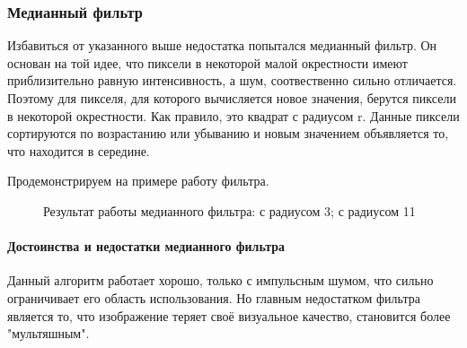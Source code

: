 \subsubsection{Медианный фильтр}
Избавиться от указанного выше недостатка попытался медианный фильтр. Он основан на той идее, что пиксели в некоторой малой окрестности имеют приблизительно равную интенсивность, а шум, соотвественно сильно отличается. Поэтому для пикселя, для которого вычисляется новое значения, берутся пиксели в некоторой окрестности. Как правило, это квадрат с радиусом r. Данные пиксели сортируются по возрастанию или убыванию и новым значением объявляется то, что находится в середине.

Продемонстрируем на примере работу фильтра.

\begin{figure}[H]
\centering {}
\hspace{4ex}
	\caption{Результат работы медианного фильтра:  с радиусом 3;  с радиусом 11}
\end{figure}
\paragraph{Достоинства и недостатки медианного фильтра}
Данный алгоритм работает хорошо, только с импульсным шумом, что сильно ограничивает его область использования. Но главным недостатком фильтра является то, что изображение теряет своё визуальное качество, становится более "мультяшным".
